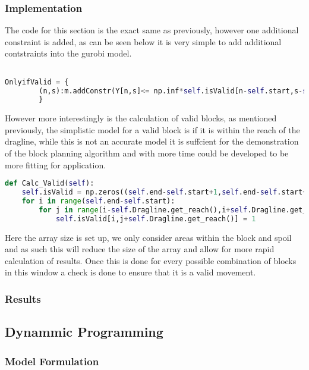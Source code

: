 \subsubsection{Implementation}
The code for this section is the exact same as previously, however one additional constraint is added, as can be seen below it is very simple to add additional contstraints into the gurobi model.
\begin{lstlisting}[language=python]

OnlyifValid = {
		(n,s):m.addConstr(Y[n,s]<= np.inf*self.isValid[n-self.start,s-self.start-self.Dragline.get_reach()]) for n in self.N for s in self.S
		}
\end{lstlisting}
However more interestingly is the calculation of valid blocks, as mentioned previously, the simplistic model for a valid block is if it is within the reach of the dragline, while this is not an accurate model it is suffcient for the demonstration of the block planning algorithm and with more time could be developed to be more fitting for application. 
\begin{lstlisting}[language = python]
def Calc_Valid(self):
	self.isValid = np.zeros((self.end-self.start+1,self.end-self.start+2*self.Dragline.get_reach()+1))
	for i in range(self.end-self.start):
		for j in range(i-self.Dragline.get_reach(),i+self.Dragline.get_reach()):
			self.isValid[i,j+self.Dragline.get_reach()] = 1
\end{lstlisting}
Here the array size is set up, we only consider areas within the block and spoil and as such this will reduce the size of the array and allow for more rapid calculation of results. Once this is done for every possible combination of blocks in this window a check is done to ensure that it is a valid movement. 
\subsubsection{Results}


\subsection{Dynammic Programming}
\subsubsection{Model Formulation}
